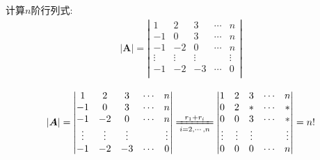 \documentclass[../../main.tex]{subfiles}%
\begin{document}
\begin{example}
计算$n$阶行列式:
\begin{gather}
|\boldsymbol{A}|=\left| \begin{matrix}
1&		2&		3&		\cdots&		n\\
-1&		0&		3&		\cdots&		n\\
-1&		-2&		0&		\cdots&		n\\
\vdots&		\vdots&		\vdots&		&		\vdots\\
-1&		-2&		-3&		\cdots&		0\\
\end{matrix} \right|
\nonumber
\end{gather}
\begin{solution}

\begin{equation}
\begin{split}
|\boldsymbol{A}|=\left| \begin{matrix}
1&		2&		3&		\cdots&		n\\
-1&		0&		3&		\cdots&		n\\
-1&		-2&		0&		\cdots&		n\\
\vdots&		\vdots&		\vdots&		&		\vdots\\
-1&		-2&		-3&		\cdots&		0\\
\end{matrix} \right|
\xlongequal[i=2,\cdots ,n]{r_1+r_i}\left| \begin{matrix}
1&		2&		3&		\cdots&		n\\
0&		2&		*&		\cdots&		*\\
0&		0&		3&		\cdots&		*\\
\vdots&		\vdots&		\vdots&		&		\vdots\\
0&		0&		0&		\cdots&		n\\
\end{matrix} \right|=n!
\end{split}
\nonumber
\end{equation}

\end{solution}
\end{example}
\end{document}
